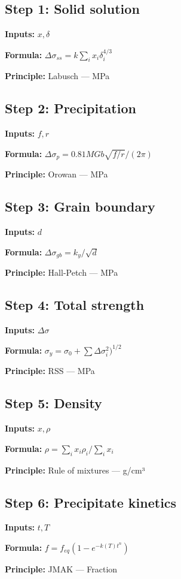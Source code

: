\documentclass[11pt,twocolumn]{article}
\begin{document}
\subsection*{Step 1: Solid solution}
\textbf{Inputs:} $x, \delta$

\textbf{Formula:} $\Delta\sigma_{ss} = k \sum_i x_i \delta_i^{4/3}$

\textbf{Principle:} Labusch --- MPa

\subsection*{Step 2: Precipitation}
\textbf{Inputs:} $f, r$

\textbf{Formula:} $\Delta\sigma_p = 0.81 M G b \sqrt{f/r} / (2\pi)$

\textbf{Principle:} Orowan --- MPa

\subsection*{Step 3: Grain boundary}
\textbf{Inputs:} $d$

\textbf{Formula:} $\Delta\sigma_{gb} = k_y / \sqrt{d}$

\textbf{Principle:} Hall-Petch --- MPa

\subsection*{Step 4: Total strength}
\textbf{Inputs:} $\Delta\sigma$

\textbf{Formula:} $\sigma_y = \sigma_0 + \sum \Delta\sigma_i^2)^{1/2}$

\textbf{Principle:} RSS --- MPa

\subsection*{Step 5: Density}
\textbf{Inputs:} $x, \rho$

\textbf{Formula:} $\rho = \sum_i x_i \rho_i / \sum_i x_i$

\textbf{Principle:} Rule of mixtures --- g/cm³

\subsection*{Step 6: Precipitate kinetics}
\textbf{Inputs:} $t, T$

\textbf{Formula:} $f = f_{eq}(1-e^{-k(T)t^n})$

\textbf{Principle:} JMAK --- Fraction
\end{document}
